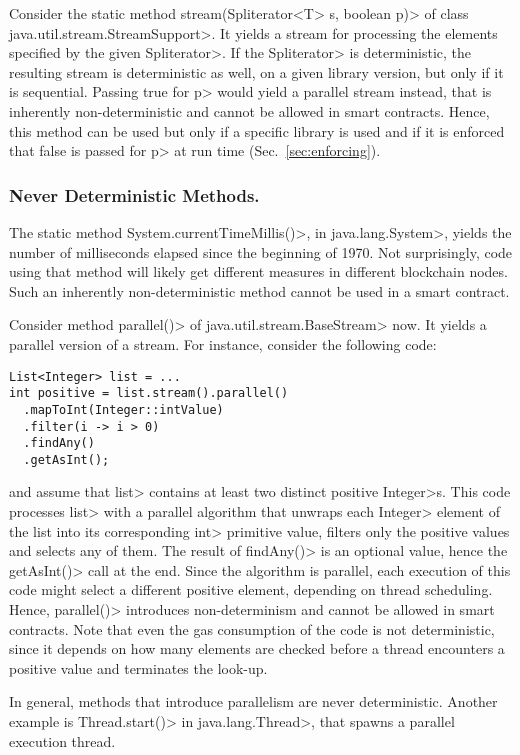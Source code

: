 Consider the static method
\<stream(Spliterator$\text{<}$T$\text{>}$ s, boolean p)>
of class \<java.util.stream.StreamSupport>. It
yields a stream for processing the elements specified by
the given \<Spliterator>. If the \<Spliterator> is deterministic,
the resulting stream is deterministic as well,
on a given library version, but only if it is sequential.
Passing true for \<p> would yield a parallel stream instead, that is
inherently non-deterministic and cannot be allowed in smart contracts.
Hence, this method can be used but only if a specific library is used and
if it is enforced that false is passed for \<p> at run time (Sec.~\ref{sec:enforcing}).

\subsubsection*{Never Deterministic Methods.}
The static method \<System.currentTimeMillis()>, in \<java.lang.System>,
yields the number of milliseconds elapsed since the beginning of 1970.
Not surprisingly, code using that method will likely get different measures in different
blockchain nodes.
Such an inherently non-deterministic method cannot be used in a smart contract.

Consider method \<parallel()> of \<java.util.stream.BaseStream> now.
It yields a parallel version of a stream. For instance, consider the following code:
%
\begin{verbatim}
List<Integer> list = ...
int positive = list.stream().parallel()
  .mapToInt(Integer::intValue)
  .filter(i -> i > 0)
  .findAny()
  .getAsInt();
\end{verbatim}
%
and assume that \<list> contains at least two distinct positive \<Integer>s.
This code processes \<list> with a parallel algorithm
that unwraps each \<Integer> element of the list into its corresponding \<int> primitive value,
filters only the positive values and selects any of them.
The result of \<findAny()> is an optional value, hence the
\<getAsInt()> call at the end. Since the algorithm is
parallel, each execution of this code might select a different
positive element, depending on thread scheduling. Hence, \<parallel()>
introduces non-determinism and
cannot be allowed in smart contracts. Note that even the gas consumption
of the code is not deterministic, since it depends on how many elements
are checked before a thread encounters a positive value and terminates
the look-up.

In general, methods that introduce parallelism are never deterministic.
Another example is \<Thread.start()> in \<java.lang.Thread>, that spawns
a parallel execution thread.

